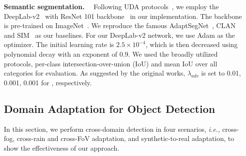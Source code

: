 \documentclass[10pt,journal,compsoc]{IEEEtran}
\renewcommand{\paragraph}[1]{\noindent\textbf{#1}~~}
\begin{document}
\paragraph{Semantic segmentation.}
Following UDA protocols~\cite{AdaptSegNet,CLAN,SIM}, we employ the DeepLab-v2~\cite{chen2017deeplab} with ResNet 101 backbone~\cite{he2016deep} in our implementation. The backbone is pre-trained on ImageNet~\cite{deng2009imagenet}. We reproduce the famous  AdaptSegNet~\cite{AdaptSegNet}, CLAN~\cite{CLAN,CLANv2} and SIM~\cite{SIM} as our baselines. For our DeepLab-v2 network, we use Adam as the optimizer. The initial learning rate is  $2.5 \times 10 ^{-4}$, which is then decreased using polynomial decay with an exponent of $0.9$. We used the broadly utilized protocols,
per-class intersection-over-union (IoU) and mean IoU over
all categories for evaluation. As suggested by the original works, $\lambda_{adv}$ is set to 0.01, 0.001, 0.001 for \cite{AdaptSegNet,CLAN,SIM}, respectively.

\subsection{Domain Adaptation for Object Detection}
\label{sec:DAOD}
In this section, we perform cross-domain detection in four scenarios, \emph{i.e.,} cross-fog, cross-rain and cross-FoV adaptation, and  synthetic-to-real adaptation, to show the effectiveness of our approach. 

\begin{table}{}
\caption{Cross-fog adaptation of semantic segmentation from Cityscapes to Foggy Zurich++ (multi-domainness). }
\label{table:c2f_seg}
\centering
{}
\end{table}
\end{document}
